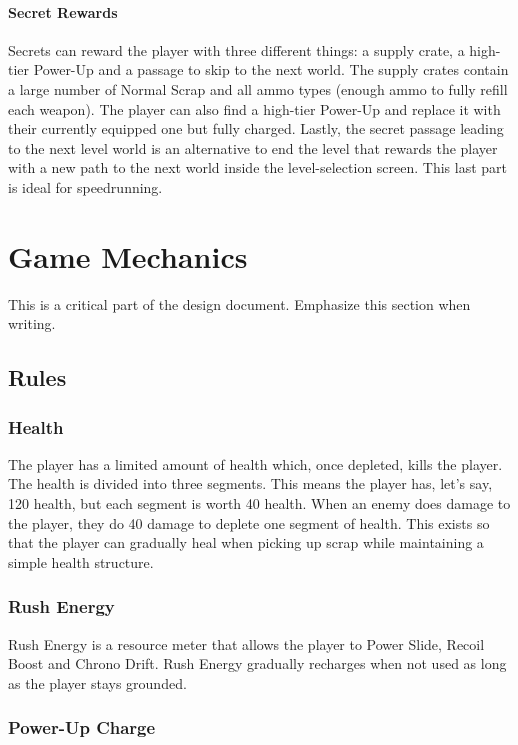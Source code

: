\documentclass[12pt]{article}
\begin{document}
\paragraph{Secret Rewards}

Secrets can reward the player with three different things: a supply crate, a high-tier Power-Up and a passage to skip to the next world. The supply crates contain a large number of Normal Scrap and all ammo types (enough ammo to fully refill each weapon). The player can also find a high-tier Power-Up and replace it with their currently equipped one but fully charged. Lastly, the secret passage leading to the next level world is an alternative to end the level that rewards the player with a new path to the next world inside the level-selection screen. This last part is ideal for speedrunning. 

\section{Game Mechanics}

This is a critical part of the design document. Emphasize this section when writing.

\subsection{Rules}

\subsubsection{Health}

The player has a limited amount of health which, once depleted, kills the player. The health is divided into three segments. This means the player has, let's say, 120 health, but each segment is worth 40 health. When an enemy does damage to the player, they do 40 damage to deplete one segment of health. This exists so that the player can gradually heal when picking up scrap while maintaining a simple health structure. 

\subsubsection{Rush Energy}

Rush Energy is a resource meter that allows the player to Power Slide, Recoil Boost and Chrono Drift. Rush Energy gradually recharges when not used as long as the player stays grounded. 

\subsubsection{Power-Up Charge}
\end{document}
